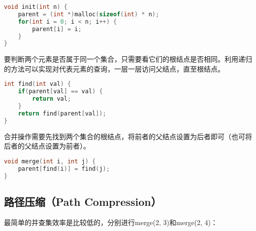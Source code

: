 
\begin{lstlisting}[language=C]
void init(int n) {
    parent = (int *)malloc(sizeof(int) * n);
    for(int i = 0; i < n; i++) {
        parent[i] = i;
    }
}
\end{lstlisting}

要判断两个元素是否属于同一个集合，只需要看它们的根结点是否相同。利用递归的方法可以实现对代表元素的查询，一层一层访问父结点，直至根结点。\\


\begin{lstlisting}[language=C]
int find(int val) {
    if(parent[val] == val) {
        return val;
    }
    return find(parent[val]);
}
\end{lstlisting}

合并操作需要先找到两个集合的根结点，将前者的父结点设置为后者即可（也可将后者的父结点设置为前者）。\\


\begin{lstlisting}[language=C]
void merge(int i, int j) {
    parent[find(i)] = find(j);
}
\end{lstlisting}

\vspace{0.5cm}

\subsection{路径压缩（Path Compression）}

最简单的并查集效率是比较低的，分别进行merge(2, 3)和merge(2, 4)：

\begin{figure}[H]
	\centering
\end{figure}


